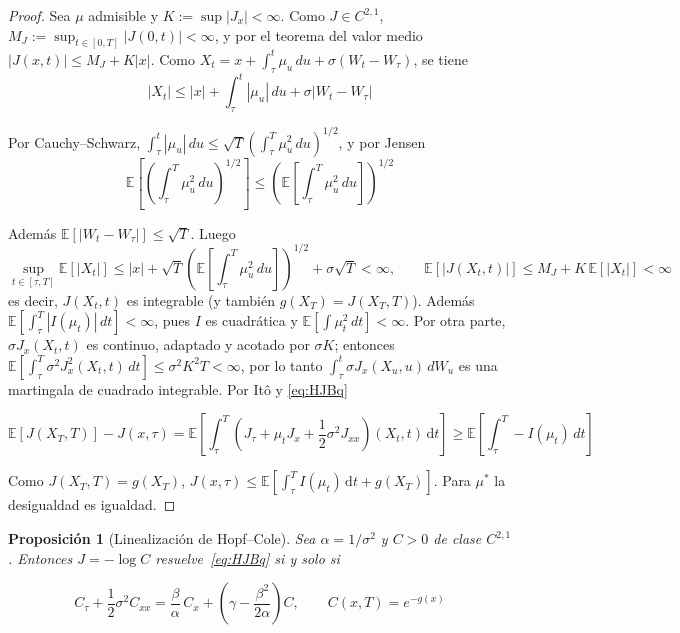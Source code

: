 \documentclass[11pt,letterpaper]{article}
\theoremstyle{plain}
\newtheorem{proposicion}[theorem]{Proposición}
\theoremstyle{definition}
\theoremstyle{remark}
\numberwithin{equation}{section}
\newcommand{\E}{\mathbb{E}}
\newcommand{\dd}{\,\mathrm{d}}
\begin{document}
	\begin{proof}
		Sea \(\mu\) admisible y \(K:=\sup|J_x|<\infty\). Como \(J\in C^{2,1}\), \(M_J:=\sup_{t\in[0,T]}|J(0,t)|<\infty\), y por el teorema del valor medio \(|J(x,t)|\le M_J+K|x|\). Como \(X_t=x+\int_\tau^t\mu_u\,du+\sigma(W_t-W_\tau)\), se tiene
		\[
		|X_t|\le |x|+\int_\tau^t|\mu_u|\,du+\sigma|W_t-W_\tau|
		\]
		
		Por Cauchy--Schwarz, \(\int_\tau^t|\mu_u|\,du\le\sqrt{T} \left(\int_\tau^T\mu_u^2\,du\right)^{1/2}\), y por Jensen 
		\[
		\E\left[\left(\int_\tau^T\mu_u^2\,du\right)^{1/2}\right]\le \left(\E\left[\int_\tau^T\mu_u^2\,du\right]\right)^{1/2}
		\]
		
		Además \(\E[|W_t-W_\tau|]\le\sqrt{T}\). Luego
		\[
		\sup_{t\in[\tau,T]}\E[|X_t|]\le |x|+\sqrt{T}\left(\E\left[\int_\tau^T\mu_u^2\,du\right]\right)^{1/2}+\sigma\sqrt{T}<\infty,
		\qquad
		\E[|J(X_t,t)|]\le M_J+K\,\E[|X_t|]<\infty
		\]
		es decir, \(J(X_t,t)\) es integrable (y también \(g(X_T)=J(X_T,T)\)). Además \(\E\left[\int_\tau^T|I(\mu_t)|\,dt\right]<\infty\), pues \(I\) es cuadrática y \(\E\left[\int\mu_t^2\,dt\right]<\infty\). Por otra parte, \(\sigma J_x(X_t,t)\) es continuo, adaptado y acotado por \(\sigma K\); entonces \(\E\left[\int_\tau^T \sigma^{2} J^{2}_x(X_t,t)\,d t\right]\le\sigma^2K^2T<\infty\), por lo tanto \(\int_\tau^t\sigma J_x(X_u,u)\,dW_u\) es una martingala de cuadrado integrable. Por Itô y \eqref{eq:HJBq}
		
		\[
		\E\left[J(X_T,T)\right]-J(x,\tau)=\E\left[\int_\tau^T\left(J_\tau+\mu_tJ_x+\frac12\sigma^2J_{xx}\right)(X_t,t)\dd t\right] \geq \E\left[\int_\tau^T -I(\mu_t)\,dt\right]
		\]
		
		Como \(J(X_T,T)=g(X_T)\), \(J(x,\tau)\le\E\left[\int_\tau^TI(\mu_t)\dd t+g(X_T)\right]\). Para \(\mu^\ast\) la desigualdad es igualdad.
		
	\end{proof}
	
	\begin{proposicion}[Linealización de Hopf--Cole]\label{prop:HC}
		Sea \(\alpha=1/\sigma^2\) y \(C>0\) de clase \(C^{2,1}\). Entonces \(J=-\log C\) resuelve~\eqref{eq:HJBq} si y solo si
		
		\begin{equation}\label{eq:lin}
			C_\tau+\frac12\sigma^2C_{xx}=\frac{\beta}{\alpha}\,C_x+\left(\gamma-\frac{\beta^2}{2\alpha}\right)C,\qquad C(x,T)=e^{-g(x)}
		\end{equation}
	\end{proposicion}
	
\end{document}
